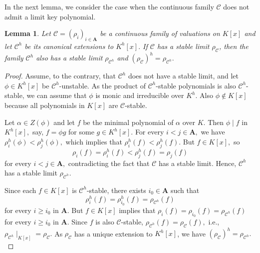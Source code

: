 \documentclass[11pt]{amsart}
\newtheorem{lemma}[theorem]{Lemma}
\theoremstyle{definition}
\theoremstyle{remark}
\numberwithin{equation}{section}
\begin{document}
In the next lemma, we consider the case when the continuous family $\mathcal{C}$ does not admit a limit key polynomial.
\begin{lemma}\label{ml1}
Let $\mathcal{C}  =(\rho_i)_{i\in\mathbf{A}}$ be a continuous family of valuations on $K[x]$ and let $\mathcal{C}^h$ be its canonical extensions to $K^h[x].$ If $\mathcal{C}$ has a stable limit $\rho_{\mathcal{C}}$, then the family $\mathcal{C}^h$ also has a stable limit $\rho_{\mathcal{C}^h}$ and  $(\rho_{\mathcal{C}})^h=\rho_{\mathcal{C}^h}.$
\end{lemma}
\begin{proof}
Assume, to the contrary, that $\mathcal{C}^h$ does not have a stable limit, and let $\phi\in K^h[x]$ be $\mathcal{C}^h$-unstable. As the product of $\mathcal{C}^h$-stable polynomials is also $\mathcal{C}^h$-stable, we can assume that $\phi$ is monic and irreducible over $K^h.$ Also $\phi\nin K[x]$ because all polynomials in $K[x]$ are $\mathcal{C}$-stable. 

Let $\alpha\in Z(\phi)$ and let $f$ be the minimal polynomial of $\alpha$ over $K.$ Then $\phi\mid f$ in $K^h[x],$ say, $f=\phi g$ for some $g\in K^h[x]$.  For every $i<j\in\mathbf{A},$ we have $\rho_i^h(\phi)<\rho_j^h(\phi),$ which implies that $\rho_i^h(f)<\rho_j^h(f)$. But $f\in K[x],$ so \[\rho_i(f)=\rho_i^h(f)<\rho_j^h(f)=\rho_j(f)\] for every $i<j\in\mathbf{A},$ contradicting the fact that $\mathcal{C}$ has a stable limit. Hence, $\mathcal{C}^h$ has a stable limit $\rho_{\mathcal{C}^h}$.

Since each $f\in K[x]$ is $\mathcal{C}^h$-stable, there exists $i_0\in\mathbf{A}$ such that \[\rho_i^h(f)=\rho_{i_0}^h(f)=\rho_{\mathcal{C}^h}(f)\] for every $i\geq i_0$ in $\mathbf{A}.$ But $f\in K[x]$ implies that $\rho_i(f)=\rho_{i_0}(f)=\rho_{\mathcal{C}^h}(f)$ for every $i\geq i_0$ in $\mathbf{A}.$ Since $f$ is also $\mathcal{C}$-stable,  $\rho_{\mathcal{C}^h}(f)=\rho_{\mathcal{C}}(f),$ i.e., $\rho_{\mathcal{C}^h}\mid_{K[x]}=\rho_{\mathcal{C}}.$ As $\rho_\mathcal{C}$ has a unique extension to $K^h[x]$, we have $(\rho_{\mathcal{C}})^h=\rho_{\mathcal{C}^h}.$ 
\end{proof}
\end{document}
